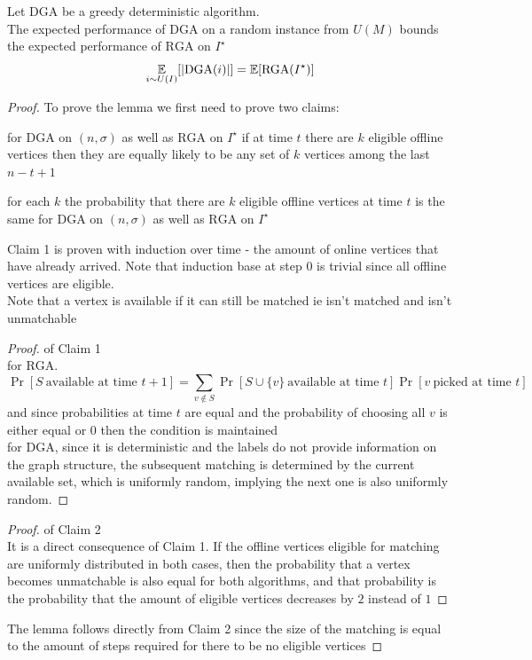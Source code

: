 \begin{lemma}
	\label{dga-rga-equiv}
	Let $\mathrm{DGA}$ be a greedy deterministic algorithm.\\
	The expected performance of $\mathrm{DGA}$ on a random instance from $U(M)$ bounds the expected performance of $\mathrm{RGA}$ on $I^\star$\\
	\[\underset{i\sim U(I)}{\mathbb{E}}[|\mathrm{DGA}(i)|]=\mathbb{E}[\mathrm{RGA}(I^\star)]\]
\end{lemma}
\begin{proof} To prove the lemma we first need to prove two claims:\\
	\begin{claim}[1]
		for $\mathrm{DGA}$ on $(n,\sigma)$ as well as $\mathrm{RGA}$ on $I^\star$ if at time $t$ there are $k$ eligible offline vertices then they are equally likely to be any set of $k$ vertices among the last $n-t+1$
	\end{claim}
	\begin{claim}[2]
		for each $k$ the probability that there are $k$ eligible offline vertices at time $t$ is the same for $\mathrm{DGA}$ on $(n,\sigma)$ as well as $\mathrm{RGA}$ on $I^\star$
	\end{claim}
	Claim 1 is proven with induction over time - the amount of online vertices that have already arrived. Note that induction base at step 0 is trivial since all offline vertices are eligible.\\
	Note that a vertex is available if it can still be matched ie isn't matched and isn't unmatchable
	\begin{proof} of Claim 1\\
		for $\mathrm{RGA}$.
		\[\Pr[S\ \text{available at time }t+1]=\sum\limits_{v\not\in S}\Pr[S\cup\{v\}\ \text{available at time }t]\Pr[v\ \text{picked at time }t]\]
		and since probabilities at time $t$ are equal and the probability of choosing all $v$ is either equal or $0$ then the condition is maintained\\
		for $\mathrm{DGA}$, since it is deterministic and the labels do not provide information on the graph structure, the subsequent matching is determined by the current available set, which is uniformly random, implying the next one is also uniformly random.
	\end{proof}
	\begin{proof} of Claim 2\\
		It is a direct consequence of Claim 1. If the offline vertices eligible for matching are uniformly distributed in both cases, then the probability that a vertex becomes unmatchable is also equal for both algorithms, and that probability is the probability that the amount of eligible vertices decreases by $2$ instead of $1$
	\end{proof}
	The lemma follows directly from Claim 2 since the size of the matching is equal to the amount of steps required for there to be no eligible vertices
\end{proof}

